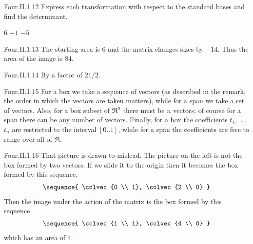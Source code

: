 \begin{ans}{Four.II.1.12}
      Express each transformation with respect to the standard bases
      and find the determinant.
      \begin{exparts*}
        \partsitem $6$
        \partsitem $-1$
        \partsitem $-5$
      \end{exparts*}
    
\end{ans}
\begin{ans}{Four.II.1.13}
      The starting area is \( 6 \) and the matrix changes sizes by
      \( -14 \).
      Thus the area of the image is \( 84 \).
    
\end{ans}
\begin{ans}{Four.II.1.14}
        By a factor of \( 21/2 \).
     
\end{ans}
\begin{ans}{Four.II.1.15}
      For a box we take a sequence of vectors (as described
      in the remark, the order in which the vectors are taken matters),
      while for a span we take a set of vectors.
      Also, for a box subset of $\Re^n$ there must be $n$ vectors;
      of course for a span there can be any number of vectors.
      Finally, for a box the coefficients $t_1$,~\ldots, $t_n$
      are restricted to the interval $[0..1]$, while for a
      span the coefficients are free to range over all of $\Re$.
    
\end{ans}
\begin{ans}{Four.II.1.16}
      That picture is drawn to mislead.
      The picture on the left is not the box formed by two vectors.
      If we slide it to the origin then it becomes the box formed by
      this sequence.
      \begin{equation*}
        \sequence{
          \colvec{0 \\ 1},
          \colvec{2 \\ 0}
       }
      \end{equation*}
      Then the image under the action of the matrix is the box formed
      by this sequence.
      \begin{equation*}
        \sequence{
          \colvec{1 \\ 1},
          \colvec{4 \\ 0}
         }
      \end{equation*}
      which has an area of $4$.
     
\end{ans}
